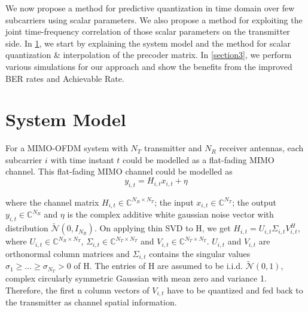 \documentclass[conference]{IEEEtran}
\begin{document}
We now propose a method for predictive quantization in time domain over few subcarriers using scalar parameters. We also propose a method for exploiting the joint time-frequency correlation of those scalar parameters on the transmitter side. In \ref{section2}, we start by explaining the system model and the method for scalar quantization \& interpolation of the precoder matrix. In \ref{section3}, we perform various simulations for our approach and show the benefits from the improved BER rates and Achievable Rate.

\section{System Model}
\label{section2}
For a MIMO-OFDM system with $N_T$ transmitter and $N_R$ receiver antennas, each subcarrier $i$ with time instant $t$ could be modelled as a flat-fading MIMO channel. This flat-fading MIMO channel could be modelled as
\vspace{-1pt}
\begin{equation}
y_{i,t} = H_{i,t} x_{i,t}+ \eta
\end{equation}

\vspace{-1pt}
where the channel matrix $H_{i,t} \in \mathbb{C}^{N_R \times N_T}$; the input $x_{i,t} \in \mathbb{C}^{N_T}$; the output $y_{i,t} \in \mathbb{C}^{N_R}$ and $\eta$ is the complex additive white gaussian noise vector with distribution $\tilde{\mathcal{N}}(0,I_{N_R})$. On applying thin SVD to H, we get $H_{i,t} = U_{i,t} \Sigma_{i,t} V_{i,t}^{H}$, where $U_{i,t} \in \mathbb{C}^{N_R \times N_T}$, $\Sigma_{i,t} \in \mathbb{C}^{N_T \times N_T}$  and $V_{i,t} \in \mathbb{C}^{N_T \times N_T}$. $U_{i,t}$ and $V_{i,t}$ are orthonormal column matrices and $\Sigma_{i,t}$ contains the singular values $\sigma_1 \geq \ldots \geq \sigma_{N_T} > 0$ of H. The entries of H are assumed to be i.i.d. $\tilde{\mathcal{N}}(0,1)$, complex circularly symmetric Gaussian with mean zero and variance 1. Therefore, the first n column vectors of $V_{i,t}$ have to be quantized and fed back to the transmitter as channel spatial information.
\end{document}
